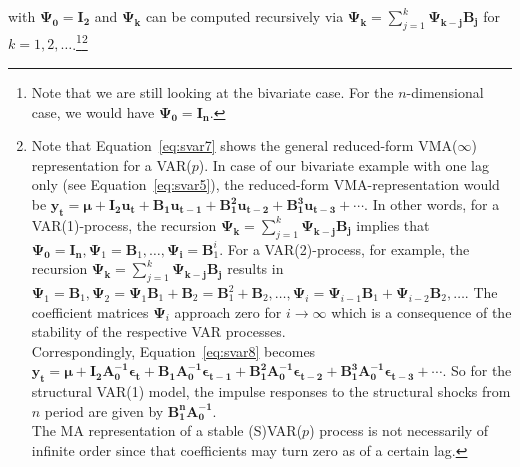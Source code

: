 \documentclass[a4paper,11pt,listof=nochaptergap,oneside,pointednumbers,bibtotoc,bigheadings,liststotoc]{scrbook}
\theoremstyle{mysatz}
\theoremstyle{mydefinition}
\theoremstyle{mytheorem}
\theoremstyle{mybemerkung}
\newcommand{\vect}[1]{\boldsymbol{\mathbf{#1}}}
\begin{document}
with $\vect{\Psi_0} =\vect{\mathbf{I_2}}$ and $\vect{\Psi_k}$ can be computed recursively via $\vect{\Psi_k} = \sum\limits_{j=1}^k \vect{\Psi_{k-j}\vect{B_j}}$ for $k=1, 2, \dots$.\footnote{Note that we are still looking at the bivariate case. For the $n$-dimensional case, we would have $\vect{\Psi_0} =\vect{\mathbf{I_n}}$.}\footnote{Note that Equation~\ref{eq:svar7} shows the general reduced-form VMA($\infty$) representation for a VAR($p$). In case of our bivariate example with one lag only (see Equation~\ref{eq:svar5}), the reduced-form VMA-representation would be $\vect{y_t} = \vect{\mu} + \vect{I_2}\vect{u_t} + \vect{{B}_1}\vect{u_{t-1}} + \vect{{B}_1^2}\vect{u_{t-2}} + \vect{{B}_1^3}\vect{u_{t-3}} + \cdots$. In other words, for a VAR(1)-process, the recursion $\vect{\Psi_k} = \sum\limits_{j=1}^k \vect{\Psi_{k-j}\vect{B_j}}$ implies that $\vect{\Psi_0}=\vect{I_n}, \vect{\Psi}_1 = \vect{B}_1, \dots, \vect{\Psi_i} = {\vect{B}}_1^i$. For a VAR(2)-process, for example, the recursion $\vect{\Psi_k} = \sum\limits_{j=1}^k \vect{\Psi_{k-j}\vect{B_j}}$ results in $\vect{\Psi}_1 = \vect{B}_1, \vect{\Psi}_2 = \vect{\Psi}_1\vect{B}_1 + \vect{B}_2 = \vect{B}_1^2 + \vect{B}_2, \dots, \vect{\Psi}_i = \vect{\Psi}_{i-1}\vect{B}_1 + \vect{\Psi}_{i-2}\vect{B}_2, \dots$. The coefficient matrices $\vect{\Psi}_i$ approach zero for $i \to \infty$ which is a consequence of the stability of the respective VAR processes.\\
Correspondingly, Equation~\ref{eq:svar8} becomes $\vect{y_t} = \vect{\mu} + \vect{I_2}\vect{{A}_0^{-1}}\vect{\epsilon_t} + \vect{{B}_1}\vect{{A}_0^{-1}}\vect{\epsilon_{t-1}} + \vect{{B}_1^2}\vect{{A}_0^{-1}}\vect{\epsilon_{t-2}} + \vect{{B}_1^3}\vect{{A}_0^{-1}}\vect{\epsilon_{t-3}} + \cdots$. So for the structural VAR(1) model, the impulse responses to the structural shocks from $n$ period are given by $\vect{{B}_1^n}\vect{{A}_0^{-1}}$.\\
The MA representation of a stable (S)VAR($p$) process is not necessarily of infinite order since that coefficients may turn zero as of a certain lag.}
\end{document}
